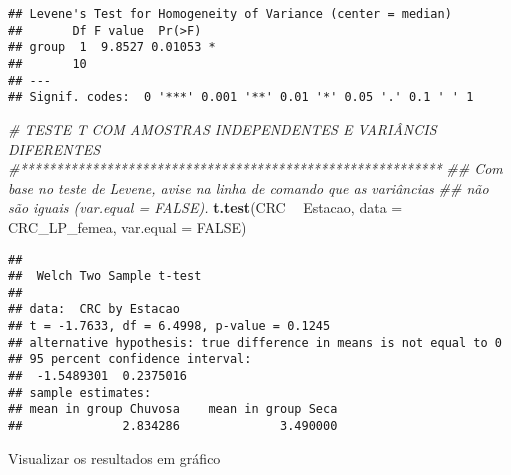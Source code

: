 \documentclass[
]{book}
\newenvironment{Shaded}{\begin{snugshade}}{\end{snugshade}}
\newcommand{\CommentTok}[1]{\textcolor[rgb]{0.56,0.35,0.01}{\textit{#1}}}
\newcommand{\DataTypeTok}[1]{\textcolor[rgb]{0.13,0.29,0.53}{#1}}
\newcommand{\KeywordTok}[1]{\textcolor[rgb]{0.13,0.29,0.53}{\textbf{#1}}}
\newcommand{\NormalTok}[1]{#1}
\newcommand{\OperatorTok}[1]{\textcolor[rgb]{0.81,0.36,0.00}{\textbf{#1}}}
\newcommand{\OtherTok}[1]{\textcolor[rgb]{0.56,0.35,0.01}{#1}}
\newcommand{\StringTok}[1]{\textcolor[rgb]{0.31,0.60,0.02}{#1}}
\begin{document}
\begin{verbatim}
## Levene's Test for Homogeneity of Variance (center = median)
##       Df F value  Pr(>F)  
## group  1  9.8527 0.01053 *
##       10                  
## ---
## Signif. codes:  0 '***' 0.001 '**' 0.01 '*' 0.05 '.' 0.1 ' ' 1
\end{verbatim}

\begin{Shaded}
\begin{Highlighting}[]
\CommentTok{# TESTE T COM AMOSTRAS INDEPENDENTES E VARIÂNCIS DIFERENTES}
\CommentTok{#***********************************************************}
\CommentTok{## Com base no teste de Levene, avise na linha de comando que as variâncias }
\CommentTok{## não são iguais (var.equal = FALSE).}
\KeywordTok{t.test}\NormalTok{(CRC }\OperatorTok{~}\StringTok{ }\NormalTok{Estacao, }\DataTypeTok{data =}\NormalTok{ CRC_LP_femea, }\DataTypeTok{var.equal =} \OtherTok{FALSE}\NormalTok{)}
\end{Highlighting}
\end{Shaded}

\begin{verbatim}
## 
## 	Welch Two Sample t-test
## 
## data:  CRC by Estacao
## t = -1.7633, df = 6.4998, p-value = 0.1245
## alternative hypothesis: true difference in means is not equal to 0
## 95 percent confidence interval:
##  -1.5489301  0.2375016
## sample estimates:
## mean in group Chuvosa    mean in group Seca 
##              2.834286              3.490000
\end{verbatim}

Visualizar os resultados em gráfico
\end{document}
